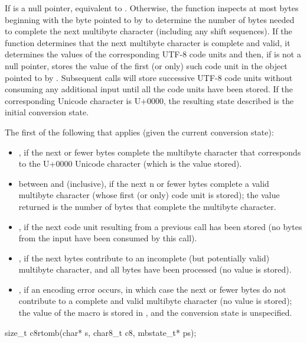 \begin{itemdescr}
\pnum
\effects
If  is a null pointer,
equivalent to .
Otherwise, the function inspects at most  bytes
beginning with the byte pointed to by 
to determine the number of bytes needed to complete
the next multibyte character (including any shift sequences).
If the function determines
that the next multibyte character is complete and valid,
it determines the values of the corresponding UTF-8 code units and then,
if  is not a null pointer,
stores the value of the first (or only) such code unit
in the object pointed to by .
Subsequent calls will store successive UTF-8 code units
without consuming any additional input
until all the code units have been stored.
If the corresponding Unicode character is U+0000,
the resulting state described is the initial conversion state.

\pnum
\returns
The first of the following that applies (given the current conversion state):
\begin{itemize}
\item {}, if the next  or fewer bytes complete
the multibyte character
that corresponds to the U+0000 Unicode character
(which is the value stored).
\item between  and  (inclusive),
if the next n or fewer bytes complete a valid multibyte character
(whose first (or only) code unit is stored);
the value returned is the number of bytes that complete the multibyte character.
\item {}, if the next code unit
resulting from a previous call has been stored
(no bytes from the input have been consumed by this call).
\item {}, if the next  bytes
contribute to an incomplete (but potentially valid) multibyte character, and
all  bytes have been processed (no value is stored).
\item {}, if an encoding error occurs,
in which case the next  or fewer bytes do not contribute to
a complete and valid multibyte character (no value is stored);
the value of the macro  is stored in , and
the conversion state is unspecified.
\end{itemize}
\end{itemdescr}

%
\begin{itemdecl}
size_t c8rtomb(char* s, char8_t c8, mbstate_t* ps);
\end{itemdecl}

